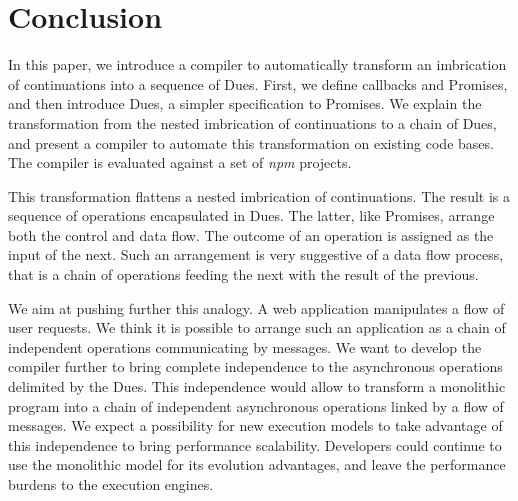 \section{Conclusion} \label{section:conclusion}

In this paper, we introduce a compiler to automatically transform an imbrication of continuations into a sequence of Dues.
First, we define callbacks and Promises, and then introduce Dues, a simpler specification to Promises.
We explain the transformation from the nested imbrication of continuations to a chain of Dues, and present a compiler to automate this transformation on existing code bases.
The compiler is evaluated against a set of \textit{npm} projects.


This transformation flattens a nested imbrication of continuations.
The result is a sequence of operations encapsulated in Dues.
The latter, like Promises, arrange both the control and data flow.
The outcome of an operation is assigned as the input of the next.
Such an arrangement is very suggestive of a data flow process, that is a chain of operations feeding the next with the result of the previous.

We aim at pushing further this analogy.
A web application manipulates a flow of user requests.
We think it is possible to arrange such an application as a chain of independent operations communicating by messages.
We want to develop the compiler further to bring complete independence to the asynchronous operations delimited by the Dues.
This independence would allow to transform a monolithic program into a chain of independent asynchronous operations linked by a flow of messages.
We expect a possibility for new execution models to take advantage of this independence to bring performance scalability.
Developers could continue to use the monolithic model for its evolution advantages, and leave the performance burdens to the execution engines.